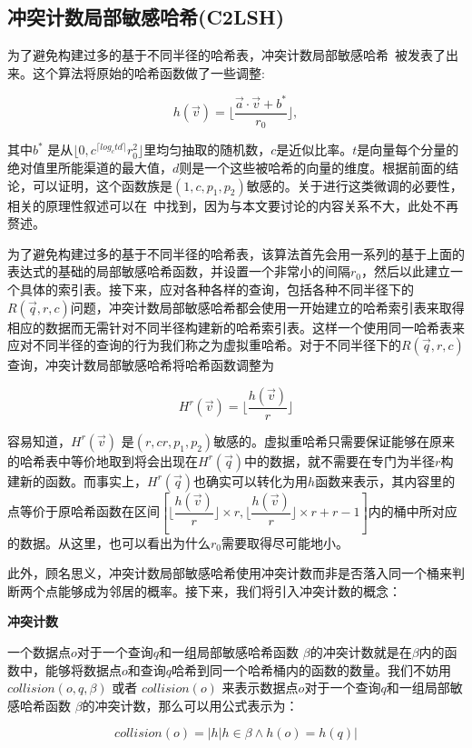 \subsection{冲突计数局部敏感哈希(C2LSH)}

为了避免构建过多的基于不同半径的哈希表，冲突计数局部敏感哈希~\cite{lazy21}被发表了出来。这个算法将原始的哈希函数做了一些调整:

\begin{equation}
	h(\vec{v}) = \lfloor \dfrac{\vec{a} \cdot \vec{v} + b^*}{r_0} \rfloor ,
\end{equation}

其中$ b^* $ 是从$ \lfloor 0, c^{\lceil log_ctd \rceil}r_0^2 \rfloor $里均匀抽取的随机数，$ c $是近似比率。$ t $是向量每个分量的绝对值里所能渠道的最大值，$ d $则是一个这些被哈希的向量的维度。根据前面的结论，可以证明，这个函数族是$ (1,c,p_1,p_2) $敏感的。关于进行这类微调的必要性，相关的原理性叙述可以在~\cite{c2lsh13}中找到，因为与本文要讨论的内容关系不大，此处不再赘述。

为了避免构建过多的基于不同半径的哈希表，该算法首先会用一系列的基于上面的表达式的基础的局部敏感哈希函数，并设置一个非常小的间隔$ r_0 $，然后以此建立一个具体的索引表。接下来，应对各种各样的查询，包括各种不同半径下的$ R(\vec{q},r,c) $问题，冲突计数局部敏感哈希都会使用一开始建立的哈希索引表来取得相应的数据而无需针对不同半径构建新的哈希索引表。这样一个使用同一哈希表来应对不同半径的查询的行为我们称之为虚拟重哈希。对于不同半径下的$ R(\vec{q},r,c) $查询，冲突计数局部敏感哈希将哈希函数调整为

\begin{equation}
	H^r(\vec{v})=\lfloor \dfrac{h(\vec{v})}{r} \rfloor
\end{equation}

容易知道，$ H^r(\vec{v}) $ 是$ (r,cr,p_1,p_2) $敏感的。虚拟重哈希只需要保证能够在原来的哈希表中等价地取到将会出现在$ H^r(\vec{q}) $中的数据，就不需要在专门为半径$ r $构建新的函数。而事实上，$ H^r(\vec{q}) $也确实可以转化为用$ h $函数来表示，其内容里的点等价于原哈希函数在区间$ [\lfloor \dfrac{h(\vec{v})}{r} \rfloor \times r,\lfloor \dfrac{h(\vec{v})}{r} \rfloor \times r + r - 1] $内的桶中所对应的数据。从这里，也可以看出为什么$ r_0 $需要取得尽可能地小。

此外，顾名思义，冲突计数局部敏感哈希使用冲突计数而非是否落入同一个桶来判断两个点能够成为邻居的概率。接下来，我们将引入冲突计数的概念：

\begin{definition}
	{\bf 冲突计数}
	
	一个数据点$ o $对于一个查询$ q $和一组局部敏感哈希函数 $ \beta $的冲突计数就是在$ \beta $内的函数中，能够将数据点$ o $和查询$ q $哈希到同一个哈希桶内的函数的数量。我们不妨用$ collision(o,q,\beta) $ 或者 $ collision(o) $ 来表示数据点$ o $对于一个查询$ q $和一组局部敏感哈希函数 $ \beta $的冲突计数，那么可以用公式表示为：
	
	\begin{equation}
		collision(o) = |{h|h\in \beta \land h(o) = h(q)}|
	\end{equation}
	
\end{definition}

